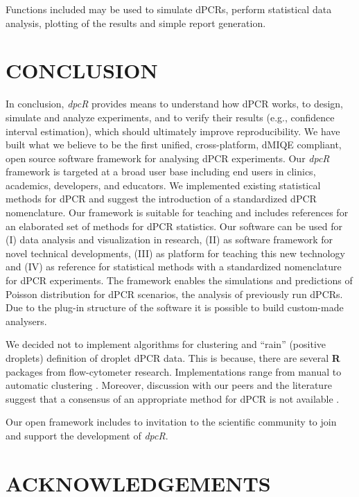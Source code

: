 \documentclass[a4,center,fleqn]{NAR}
\begin{document}
Functions included may be used to simulate dPCRs, perform statistical data 
analysis, plotting of the results and simple report generation. 

\section{CONCLUSION}

In conclusion, \textit{dpcR} provides means to understand how dPCR works, to 
design, simulate and analyze experiments, and to verify their results (e.g., 
confidence interval estimation), which should ultimately improve 
reproducibility. We have built what we believe to be the first unified, 
cross-platform, dMIQE compliant, open source software framework for analysing 
dPCR experiments. Our \textit{dpcR} framework is targeted at a broad user base 
including end users in clinics, academics, developers, and educators. We 
implemented existing statistical methods for dPCR and suggest the introduction 
of a standardized dPCR nomenclature. Our framework is suitable for teaching and 
includes references for an elaborated set of methods for dPCR statistics. Our 
software can be used for (I) data analysis and visualization in research, (II) 
as software framework for novel technical developments, (III) as platform for 
teaching this new technology and (IV) as reference for statistical methods with 
a standardized nomenclature for dPCR experiments. The framework enables the 
simulations and predictions of Poisson distribution for dPCR scenarios, the 
analysis of previously run dPCRs. Due to the plug-in structure of the software 
it is possible to build custom-made analysers.

We decided not to implement algorithms for clustering and ``rain'' (positive 
droplets) definition of droplet dPCR data. This is because, there are several 
\textbf{R} packages from flow-cytometer research. Implementations range from 
manual to automatic clustering \cite{le_meur_computational_2013, 
milbury_determining_2014, Malek15022015, trypsteen_ddpcrquant_2015}. Moreover, 
discussion with our peers and the literature suggest that a consensus of an 
appropriate method for dPCR is not available \cite{trypsteen_ddpcrquant_2015}.

Our open framework includes to invitation to the scientific community to join 
and support the development of \textit{dpcR}.


\section{ACKNOWLEDGEMENTS}
\end{document}
